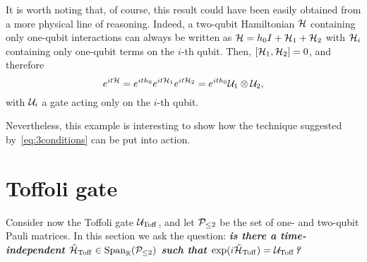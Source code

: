 \begin{example}[label={ex:cnot_with_conditions}]
It is worth noting that, of course, this result could have been easily obtained from a more physical line of reasoning. Indeed, a two-qubit Hamiltonian ${\mathcal{H}}$ containing only one-qubit interactions can always be written as ${\mathcal{H}}=h_0 I+{\mathcal{H}}_1+{\mathcal{H}}_2$ with ${\mathcal{H}}_i$ containing only one-qubit terms on the $i$-th qubit. Then, $[{\mathcal{H}}_1,{\mathcal{H}}_2]=0$, and therefore
\begin{equation}
    e^{it{\mathcal{H}}}=e^{it h_0}e^{it{\mathcal{H}}_1}e^{it{\mathcal{H}}_2}=e^{it h_0} {\mathcal{U}}_1\otimes{\mathcal{U}}_2,
\end{equation}
with ${\mathcal{U}}_i$ a gate acting only on the $i$-th qubit.

Nevertheless, this example is interesting to show how the technique suggested by~\cref{eq:3conditions} can be put into action.
\end{example}

\section{Toffoli gate}
\label{sec:GL:toffoli}
Consider now the Toffoli gate ${\mathcal{U}}_{\operatorname{Toff}}$, and let ${\mathcal{P}}_{\le2}$ be the set of one- and two-qubit Pauli matrices. In this section we ask the question: \textit{\textbf{is there a time-independent $\tilde{{\mathcal{H}}}_{\operatorname{Toff}}\in\operatorname{Span}_{\mathbb{R}}({\mathcal{P}}_{\le2})$ such that $\exponential(i\HTildeToff)=\UToff$?}}

